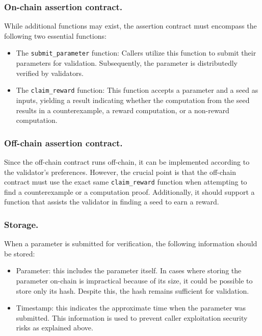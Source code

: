 \documentclass[runningheads]{llncs}
\begin{document}
\subsubsection{On-chain assertion contract.}
While additional functions may exist, the assertion contract must encompass the following two essential functions:
\begin{itemize}
\item The \lstinline|submit_parameter| function: Callers utilize this function to submit their parameters for validation. Subsequently, the parameter is distributedly verified by validators.
\item  The \lstinline|claim_reward| function: This function accepts a parameter and a seed as inputs, yielding a result indicating whether the computation from the seed results in a counterexample, a reward computation, or a non-reward computation.
\end{itemize}
\subsubsection{Off-chain assertion contract.}
Since the off-chain contract runs off-chain, it can be implemented according to the validator's preferences. However, the crucial point is that the off-chain contract must use the exact same \lstinline|claim_reward| function when attempting to find a counterexample or a computation proof. Additionally, it should support a function that assists the validator in finding a seed to earn a reward.
\subsubsection{Storage.}
When a parameter is submitted for verification, the following information should be stored:
\begin{itemize}
\item Parameter: this includes the parameter itself. In cases where storing the parameter on-chain is impractical because of its size, it could be possible to store only its hash. Despite this, the hash remains sufficient for validation.
\item Timestamp: this indicates the approximate time when the parameter was submitted. This information is used to prevent caller exploitation security risks as explained above.
\end{itemize}
\end{document}
